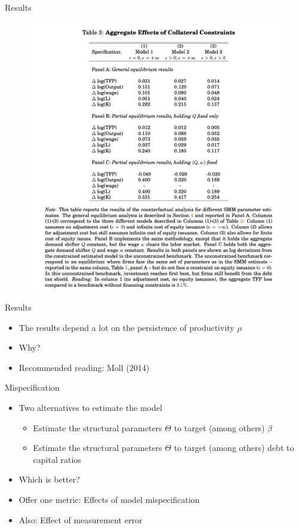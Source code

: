 \documentclass[english,xcolor=svgnames,aspectratio=169]{beamer}
\begin{document}
\begin{frame}{Results}
\begin{figure}
\includegraphics[scale=0.35]{figures/cchst_3}
\end{figure}
\end{frame}

\begin{frame}{Results}
\begin{itemize}
\item The results depend a lot on the persistence of productivity $\rho$
\item Why?
\item Recommended reading: Moll (2014)
\end{itemize}
\end{frame}

\begin{frame}{Mispecification}
\begin{itemize}
\item Two alternatives to estimate the model
\begin{itemize}
\item Estimate the structural parameters $\Theta$ to target (among others) $\beta$
\item Estimate the structural parameters $\Theta$ to target (among others) debt to capital ratios
\end{itemize}
\item Which is better?
\item Offer one metric: Effects of model mispecification
\item Also: Effect of measurement error
\end{itemize}
\end{frame}
\end{document}
